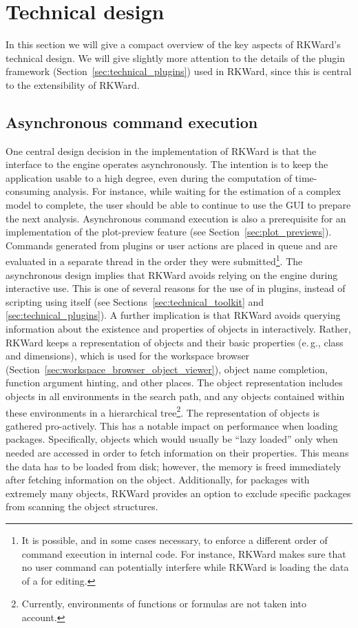 \section{Technical design}
\label{sec:technical}
In this section we will give a compact overview of the key aspects of RKWard's
technical design. We will give slightly more attention to the details of the
plugin framework (Section~\ref{sec:technical_plugins}) used in RKWard, since this is central to the extensibility of
RKWard.

\subsection{Asynchronous command execution}
\label{sec:technical_asynchronous}
One central design decision in the implementation of RKWard is that the
interface to the  engine operates asynchronously. The intention is to
keep the application usable to a high degree, even during the computation of
time-consuming analysis. For instance, while waiting for the estimation of a
complex model to complete, the user should be able to continue to use the GUI to
prepare the next analysis. Asynchronous command execution is also a prerequisite
for an implementation of the plot-preview feature (see Section~\ref{sec:plot_previews}). Commands
generated from plugins or user actions are placed in queue and are evaluated in
a separate thread in the order they were submitted\footnote{
    It is possible, and in some cases necessary, to enforce a different order of command execution in
    internal code. For instance, RKWard makes sure that no user command can
    potentially interfere while RKWard is loading the data of a  for
    editing.
}. The asynchronous design implies that RKWard avoids relying on the
 engine during interactive use. This is one of several reasons for
the use of  in plugins, instead of scripting using
 itself (see Sections~\ref{sec:technical_toolkit} and \ref{sec:technical_plugins}).
A further implication is that RKWard avoids querying information about the
existence and properties of objects in  interactively. Rather,
RKWard keeps a representation of  objects and their basic properties
(e.\,g., class and dimensions), which is used for the workspace browser (Section~\ref{sec:workspace_browser_object_viewer}),
object name completion, function argument hinting, and
other places. The object representation includes objects in all environments
in the search path, and any objects contained within these environments in a
hierarchical tree\footnote{
    Currently, environments of functions or formulas are not taken into account.
}. The representation of  objects is gathered
pro-actively. This has a notable impact on performance when loading packages.
Specifically, objects which would usually be ``lazy loaded'' only when needed \citep[see][]{Ripley2004} are
accessed in order to fetch information on their properties. This means the data
has to be loaded from disk; however, the memory is freed immediately after fetching
information on the object. Additionally, for packages with extremely many objects, RKWard
provides an option to exclude specific packages from scanning the object structures.

